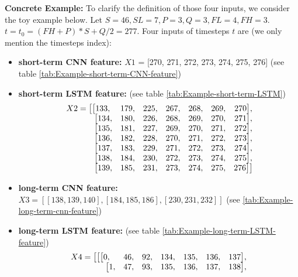\textbf{Concrete Example: }
To clarify the definition of those four inputs, we consider the toy example below. Let $S = 46, SL = 7, P = 3, Q = 3, FL = 4, FH = 3$. $t = t_0 = (FH + P)*S + Q/2 = 277$.
Four inputs of timesteps $t$ are (we only mention the timesteps index):
\begin{itemize}
    \item \textbf{short-term CNN feature:} $X1$ = [270, 271, 272, 273, 274, 275, 276] 
    (see table \ref{tab:Example-short-term-CNN-feature})
    \item \textbf{short-term LSTM feature:} 
    (see table \ref{tab:Example-short-term-LSTM}) \newline
    \[ \begin{array}{ccccccc}
        \mbox{$X2 = \big[$} \big[ 133, & 179, & 225, & 267, & 268, & 269, & 270 \big], \\
        \mbox{\hspace{1.3cm}} \big[ 134, & 180, & 226, & 268, & 269, & 270, & 271 \big],  \\
        \mbox{\hspace{1.3cm}} \big[ 135, & 181, & 227, & 269, & 270, & 271, & 272 \big], \\
        \mbox{\hspace{1.3cm}} \big[ 136, & 182, & 228, & 270, & 271, & 272, & 273 \big], \\
        \mbox{\hspace{1.3cm}} \big[ 137, & 183, & 229, & 271, & 272, & 273, & 274 \big], \\
        \mbox{\hspace{1.3cm}} \big[ 138, & 184, & 230, & 272, & 273, & 274, & 275 \big], \\
        \mbox{\hspace{1.3cm}} \big[ 139, & 185, & 231, & 273, & 274, & 275, & 276 \big] \big]\end{array} \]
    \item \textbf{long-term CNN feature:} \\ $X3 = [[138, 139, 140], [184, 185, 186], [230, 231, 232]]$ (see \ref{tab:Example-long-term-cnn-feature})
    \item \textbf{long-term LSTM feature:} 
    (see table \ref{tab:Example-long-term-LSTM-feature}) \newline
    \[ \begin{array}{lllllll}
        \mbox{$X4 = \big[ \big[$} \big[ 0, & 46, & 92, & 134, & 135, & 136, & 137 \big], \\
        \mbox{\hspace{1.5cm}} \big[ 1, & 47, & 93, & 135, & 136, & 137, & 138 \big], \\

\end{array}\]
\end{itemize}
